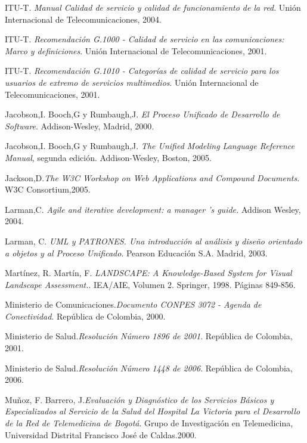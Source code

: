 \begin{thebibliography}{}
 ITU-T. \textit{Manual Calidad de servicio y calidad de funcionamiento de la red}. Unión Internacional de Telecomunicaciones, 2004.

 ITU-T. \textit{Recomendación G.1000 - Calidad de servicio en las comunicaciones: Marco y definiciones}. Unión Internacional de Telecomunicaciones, 2001.

 ITU-T. \textit{Recomendación G.1010 - Categorías de calidad de servicio para los usuarios de extremo de servicios multimedios}. Unión Internacional de Telecomunicaciones, 2001.

 Jacobson,I. Booch,G y Rumbaugh,J. \textit{El Proceso Unificado de Desarrollo de Software}. Addison-Wesley, Madrid, 2000.

 Jacobson,I. Booch,G y Rumbaugh,J. \textit{The Unified Modeling Language Reference Manual}, segunda edición. Addison-Wesley, Boston, 2005.

 Jackson,D.\textit{The W3C Workshop on Web Applications and Compound Documents}. W3C Consortium,2005.

 Larman,C. \textit{Agile and iterative development: a manager ’s guide.} Addison Wesley, 2004.

 Larman, C. \textit{UML y PATRONES. Una introducción al análisis y diseño orientado a objetos y al Proceso Unificado}. Pearson Educación S.A. Madrid, 2003.

 Martínez, R. Martín, F. \textit{LANDSCAPE: A Knowledge-Based System for Visual Landscape Assessment.}. IEA/AIE, Volumen 2. Springer, 1998. Páginas 849-856.

 Ministerio de Comunicaciones.\textit{Documento CONPES 3072 - Agenda de Conectividad}. República de Colombia, 2000.

 Ministerio de Salud.\textit{Resolución Número 1896 de 2001}. República de Colombia, 2001.

 Ministerio de Salud.\textit{Resolución Número 1448 de 2006}. República de Colombia, 2006.

 Muñoz, F. Barrero, J.\textit{Evaluación y Diagnóstico de los Servicios Básicos y Especializados al Servicio de la Salud del Hospital La Victoria para el Desarrollo de la Red de Telemedicina de Bogotá}. Grupo de Investigación en Telemedicina,  Universidad Distrital Francisco José de Caldas.2000.


\end{thebibliography}
